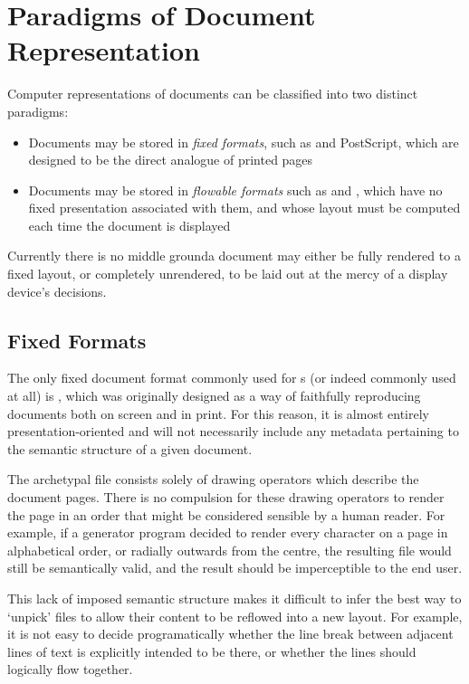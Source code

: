 \section{Paradigms of Document Representation}
Computer representations of documents can be classified into two distinct paradigms:
\begin{itemize}
 \item Documents may be stored in \emph{fixed formats}, such as \pdf{} and PostScript, which are designed to be the direct analogue of printed pages
 \item Documents may be stored in \emph{flowable formats} such as \html{} and \epub{}, which have no fixed presentation associated with them, and whose layout must be computed each time the document is displayed
\end{itemize}
Currently there is no middle ground\ed a document may either be fully rendered to a fixed layout, or completely unrendered, to be laid out at the mercy of a display device's decisions.

\subsection{Fixed Formats}
\label{sec:fixedformats}
The only fixed document format commonly used for \ebook{}s (or indeed commonly used at all) is \pdf{}, which was originally designed as a way of faithfully reproducing documents both on screen and in print. For this reason, it is almost entirely pre\-s\-en\-ta\-tion-oriented and will not necessarily include any metadata pertaining to the semantic structure of a given document.

The archetypal \pdf{} file consists solely of drawing operators which describe the document pages. There is no compulsion for these drawing operators to render the page in an order that might be considered sensible by a human reader. For example, if a \pdf{} generator program decided to render every character on a page in alphabetical order, or radially outwards from the centre, the resulting file would still be semantically valid, and the result should be imperceptible to the end user.

This lack of imposed semantic structure makes it difficult to infer the best way to `unpick' \pdf{} files to allow their content to be reflowed into a new layout. For example, it is not easy to decide programatically whether the line break between adjacent lines of text is explicitly intended to be there, or whether the lines should logically flow together.

